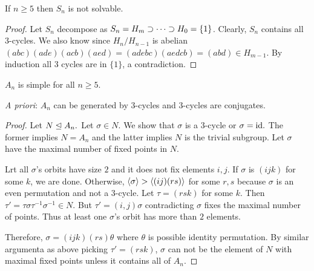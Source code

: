     \begin{theorem}
        If $n \geq 5$ then $S_n$ is not solvable.
    \end{theorem}

    \begin{proof}
        Let $S_n$ decompose as $S_n = H_m \supset \cdots \supset H_0 = \{1\}$. Clearly, $S_n$ contains all $3$-cycles. We also know since $H_n/H_{n-1}$ is abelian $(abc)(ade)(acb)(aed) = (adebc)(aedcb) = (abd) \in H_{m-1}$. By induction all 3 cycles are in $\{1\}$, a contradiction.
    \end{proof}

    \begin{theorem}
        $A_n$ is simple for all $n \geq 5$.
    \end{theorem}
    \noindent \textit{A priori}: $A_n$ can be generated by $3$-cycles and $3$-cycles are conjugates.
    \begin{proof}
        Let $N \trianglelefteq A_n.$ Let $\sigma \in N$. We show that $\sigma$ is a $3$-cycle or $\sigma = \text{id}.$ The former implies $N = A_n$ and the latter implies $N$ is the trivial subgroup.  Let $\sigma$ have the maximal number of fixed points in $N$.

      Lrt all $\sigma$'s orbits have size $2$ and it does not fix elements $i, j$. If $\sigma$ is $(ijk)$ for some $k$, we are done. Otherwise,  $\langle \sigma \rangle > \langle (ij)(rs) \rangle$ for some $r, s$ because $\sigma$ is an even permutation and not a $3$-cycle. Let $\tau = (rsk)$ for some $k$. Then $\tau' = \tau \sigma \tau^{-1} \sigma^{-1}  \in N$. But $\tau' = (i, j)\sigma$ contradicting $\sigma$ fixes the maximal number of points. Thus at least one $\sigma$'s orbit has more than $2$ elements.

    Therefore, $\sigma = (ijk)(rs) \theta$ where $\theta$ is possible identity permutation. By similar argumenta as above picking $\tau' = (rsk)$, $\sigma$ can not be the element of $N$ with maximal fixed points unless it contains all of $A_n$.  
    \end{proof} 
